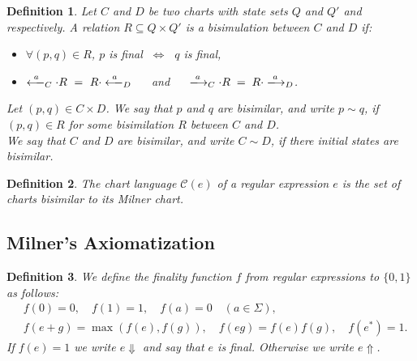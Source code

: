 \documentclass{article}
\newtheorem{definition}{Definition}[section]
\begin{document}
\begin{definition}
Let $C$ and $D$ be two charts with state sets $Q$ and $Q'$ and respectively. A relation $R\subseteq Q\times Q'$ is a \emph{bisimulation} between $C$ and $D$ if:
\begin{itemize}
    \item $\forall (p,q)\in R$, $p$ is final $\; \Leftrightarrow\;$ $q$ is final,
    \item $\xlongleftarrow{a}_{C}\cdot R\ =\ R \cdot \xlongleftarrow{a}_{D}$ $\quad$ and $\quad$ $ \xlongrightarrow{a}_{C} \cdot R\;=\;R \cdot \xlongrightarrow{a}_{D}$.
\end{itemize}

Let $(p,q)\in C\times D$. We say that $p$ and $q$ are \emph{bisimilar}, and write $p\sim q$, if $(p,q)\in R$ for some bisimilation $R$ between $C$  and $D$.\\

We say that $C$ and $D$ are \emph{bisimilar}, and write $C \sim D$, if there initial states are bisimilar.
\end{definition}

\begin{definition}
The \emph{chart language} $\mathcal{C}(e)$ of a regular expression $e$ is the set of charts bisimilar to its Milner chart. 
\end{definition}

\subsection{Milner's Axiomatization}


\begin{definition} We define the \emph{finality} function $f$ from regular
         expressions to $\{0,1\}$
         as follows:
\[
\begin{aligned}
&f(0)=0, \quad f(1)=1, \quad f(a)=0 \quad (a \in \Sigma), \\[0.3em]
&f(e+g)=\max(f(e),f(g)), \quad f(eg)=f(e)f(g), \quad f(e^*)=1 .
\end{aligned}
\]
If $f(e)=1$ we write $e\Downarrow$ and say that $e$ is \emph{final}. Otherwise we write $e\Uparrow$. 
    \end{definition}
\end{document}

